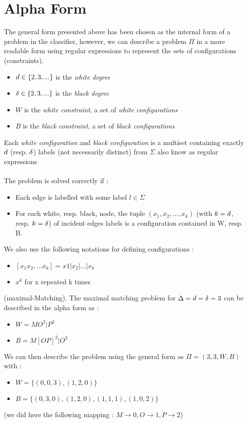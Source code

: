 \section{Alpha Form}
The general form presented above has been chosen as the internal form of a problem in the classifier, however, we can describe a problem $\Pi$ in a more readable form using regular expressions \cite{1,LB_MM} to represent the sets of configurations (constraints).
\begin{itemize}
    \item $d\in\{2,3,...\}$ is the \textit{white degree}
    \item $\delta\in\{2,3,...\}$ is the \textit{black degree}
    \item $W$ is the \textit{white constraint}, a set of \textit{white configurations}
    \item $B$ is the \textit{black constraint}, a set of \textit{black configurations}
\end{itemize}
Each \textit{white configuration}  and \textit{black configuration} is a multiset containing exactly $d$ (resp. $\delta$) labels (not necessarily distinct) from $\Sigma$ also know as regular expressions\\\\
The problem is solved correctly if :
\begin{itemize}
    \item Each edge is labelled with some label $l\in\Sigma$
    \item For each white, resp. black, node, the tuple $(x_1,x_2, ..., x_k)$ (with $k=d$, resp. $k=\delta$) of incident edges labels is a configuration contained in W, resp. B.
\end{itemize}
We also use the following notations for defining configurations :
\begin{itemize}
    \item $[x_1x_2,...x_k] = x1|x_2|...|x_k$
    \item $x^k$ for x repeated k times
\end{itemize}
\begin{exmp}
(maximal-Matching). The maximal matching problem for $\Delta = d = \delta = 3$ can be described in the alpha form as :
\begin{itemize}
    \item $W = MO^{2}|P^{3}$
    \item $B = M[OP]^{2}|O^{3}$
\end{itemize}
We can then describe the problem using the general form as
$\Pi = (3,3,W,B)$ with :
\begin{itemize}
    \item $W = \{(0,0,3),(1, 2, 0)\}$
    \item $B = \{(0,3,0),(1,2,0),(1,1,1),(1,0,2)\}$
\end{itemize}
(we did here the following mapping : $M\rightarrow 0, O\rightarrow 1, P\rightarrow 2$)
\end{exmp}
